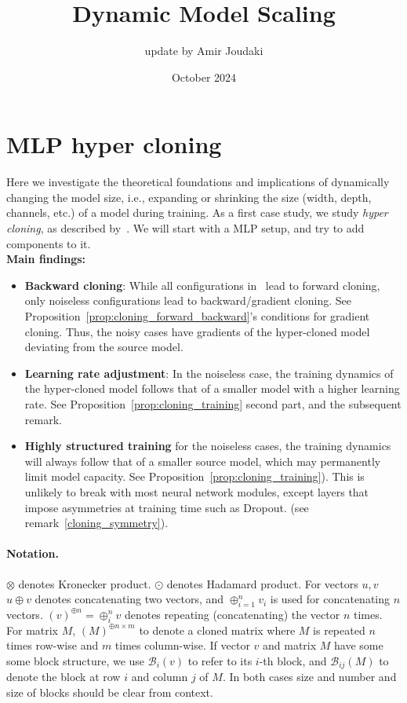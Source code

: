 \documentclass{article}
\title{Dynamic Model Scaling}
\author{update by Amir Joudaki}
\date{October 2024}
\newcommand{\1}{\mathbf{1}}
\newcommand{\R}[2]{\mathcal{R}_{#2}(#1)}
\renewcommand{\R}[2]{({#1})^{\oplus #2}}
\newcommand{\bl}[2]{\mathcal{B}_{#2}({#1})}
\begin{document}
\maketitle


\section{MLP hyper cloning}
Here we investigate the theoretical
foundations and implications of dynamically changing the model size, i.e., expanding or shrinking the size (width, depth, channels, etc.) of a model during training. As a first case study, we study \textit{hyper cloning}, as described by~\citet{samragh2024scaling}. We will start with a MLP setup, and try to add components to it.
\\

\textbf{Main findings:}
\begin{itemize}
    \item \textbf{Backward cloning}: While all configurations in~\citet{samragh2024scaling} lead to forward cloning, only noiseless configurations lead to backward/gradient cloning. See Proposition~\ref{prop:cloning_forward_backward}'s conditions for gradient cloning. Thus, the noisy cases have gradients of the hyper-cloned model deviating from the source model. 
    \item \textbf{Learning rate adjustment}: In the noiseless case, the training dynamics of the hyper-cloned model follows that of a smaller model with a higher learning rate. See Proposition~\ref{prop:cloning_training} second part, and the subsequent remark. 
    \item \textbf{Highly structured training} for the noiseless cases, the training dynamics will always follow that of a smaller source model, which may permanently limit model capacity. See Proposition~\ref{prop:cloning_training}). This is unlikely to break with most neural network modules, except layers that impose asymmetries at training time such as Dropout. (see remark~\ref{cloning_symmetry}). 
\end{itemize}


\paragraph{Notation.} 
$\otimes $ denotes Kronecker product. $\odot$ denotes Hadamard product.
For vectors $u,v$ $u\oplus v $ denotes concatenating two vectors, and $\oplus_{i=1}^n v_i$ is used for concatenating $n$ vectors.
$\R{v}{n}=\oplus_i^n v$ denotes repeating (concatenating) the vector $n$ times. For matrix $M$, $\R{M}{n\times m}$ to denote a cloned matrix where $M$ is repeated $n$ times row-wise and $m$ times column-wise. If vector $v$ and matrix $M$ have some some block structure, we use $\bl{v}{i}$ to refer to its $i$-th block, and $\bl{M}{ij}$ to denote the block at row $i$ and column $j$ of $M.$ In both cases size and number and size of blocks should be clear from context. 
\newpage 
\end{document}
